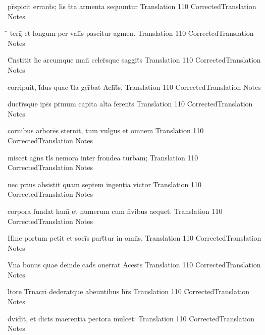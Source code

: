 \documentclass[]{book}
\begin{document}
\latline
  {pr\={}spicit errant\={\macron {\i}}s; h\={}s t\={}ta armenta sequuntur}
  { Translation }
  {110}
  { CorrectedTranslation }
  { Notes }


\latline
  {\={} terg\={} et longum per vall\={\macron {\i}}s pascitur agmen.}
  { Translation }
  {110}
  { CorrectedTranslation }
  { Notes }



\latline
  {C\={}nstitit h\={\macron {\i}}c arcumque man\={} celer\={\macron {\i}}sque saggit\={}s}
  { Translation }
  {110}
  { CorrectedTranslation }
  { Notes }


\latline
  {corripuit, f\={\macron {\i}}dus quae t\={}la ger\={}bat Ach\={}t\={}s,}
  { Translation }
  {110}
  { CorrectedTranslation }
  { Notes }


\latline
  {duct\={}r\={}sque ips\={}s pr\={\macron {\i}}mum capita alta ferent\={\macron {\i}}s}
  { Translation }
  {110}
  { CorrectedTranslation }
  { Notes }



\latline
  {cornibus arbore\={\macron {\i}}s sternit, tum vulgus et omnem}
  { Translation }
  {110}
  { CorrectedTranslation }
  { Notes }


\latline
  {miscet ag\={}ns t\={}l\={\macron {\i}}s nemora inter frondea turbam;}
  { Translation }
  {110}
  { CorrectedTranslation }
  { Notes }


\latline
  {nec prius absistit quam septem ingentia victor }
  { Translation }
  {110}
  { CorrectedTranslation }
  { Notes }



\latline
  {corpora fundat hum\={\macron {\i}} et numerum cum n\={}vibus aequet.}
  { Translation }
  {110}
  { CorrectedTranslation }
  { Notes }


\latline
  {Hinc portum petit et soci\={}s part\={\macron {\i}}tur in omn\={\macron {\i}}s.}
  { Translation }
  {110}
  { CorrectedTranslation }
  { Notes }


\latline
  {V\={\macron {\i}}na bonus quae deinde cad\={\macron {\i}}s oner\={}rat Acest\={}s}
  { Translation }
  {110}
  { CorrectedTranslation }
  { Notes }



\latline
  {l\={\macron {\i}}tore Tr\={\macron {\i}}nacri\={} dederatque abeuntibus h\={}r\={}s}
  { Translation }
  {110}
  { CorrectedTranslation }
  { Notes }


\latline
  {d\={\macron {\i}}vidit, et dict\={\macron {\i}}s maerentia pectora mulcet:}
  { Translation }
  {110}
  { CorrectedTranslation }
  { Notes }
\end{document}
